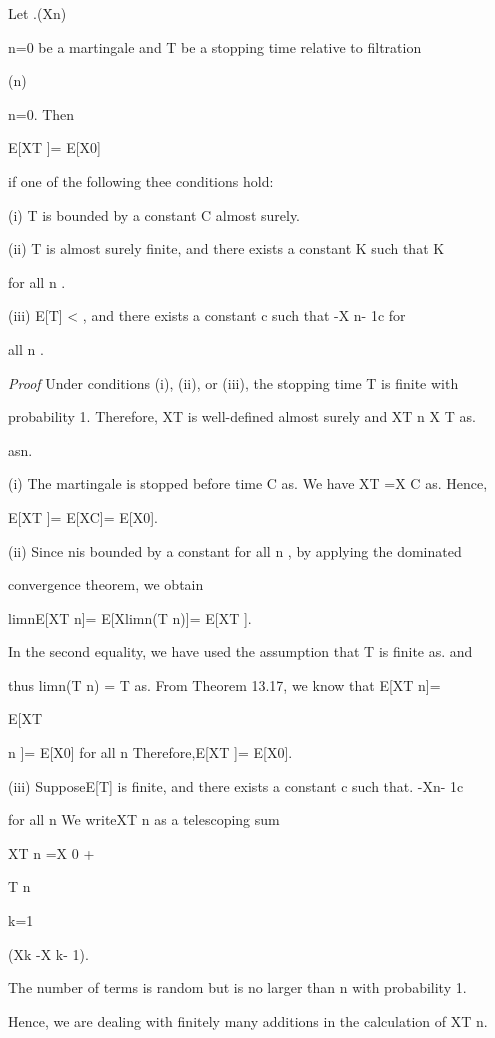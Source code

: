 {Let .(Xn)\infty

n=0 be a martingale and T be a stopping time relative to filtration

(n)\infty

n=0. Then

E[XT ]= E[X0]

if one of the following thee conditions hold:

(i) T is bounded by a constant C almost surely.

(ii) T is almost surely finite, and there exists a constant K such that \vertXn\vert\leq K

for all n .

(iii) E[T] < \infty , and there exists a constant c such that \vertXn -X n- 1\vert\leq c for

all n .

\textit{Proof} Under conditions (i), (ii), or (iii), the stopping time T is finite with

probability 1. Therefore, XT is well-defined almost surely and XT n \to X T as.

asn\to\infty .

(i) The martingale is stopped before time C as. We have XT =X C as. Hence,

E[XT ]= E[XC]= E[X0].

(ii) Since \vertXT n\vert is bounded by a constant for all n , by applying the dominated

convergence theorem, we obtain

limn\to\infty E[XT n]= E[Xlimn(T n)]= E[XT ].

In the second equality, we have used the assumption that T is finite as. and

thus limn(T n) = T as. From Theorem 13.17, we know that E[XT n]=

E[XT

n ]= E[X0] for all n Therefore,E[XT ]= E[X0].

(iii) SupposeE[T] is finite, and there exists a constant c such that. \vertXn -Xn- 1\vert\leq c

for all n We writeXT n as a telescoping sum

XT n =X 0 +

T n\sum

k=1

(Xk -X k- 1).

The number of terms is random but is no larger than n with probability 1.

Hence, we are dealing with finitely many additions in the calculation of XT n.

}
